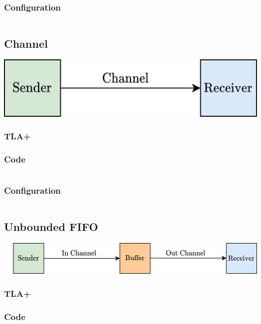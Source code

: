 \subsubsection{Configuration}
\inputminted{text}{tla_plus/code/AsyncMessage.cfg}

\subsection{Channel}
\begin{center}
    \includegraphics[width=.5\textwidth]{tla_plus/images/channel.drawio.png}
\end{center}
\subsubsection{TLA+}

\subsubsection{Code}
\inputminted{text}{tla_plus/code/Channel.tla}
\subsubsection{Configuration}
\inputminted{text}{tla_plus/code/Channel.cfg}

\subsection{Unbounded FIFO}
\begin{center}
    \includegraphics[width=.8\textwidth]{tla_plus/images/unbounded_FIFO.drawio.png}
\end{center}
\subsubsection{TLA+}

\subsubsection{Code}
\inputminted{text}{tla_plus/code/UnboundedFIFO.tla}
